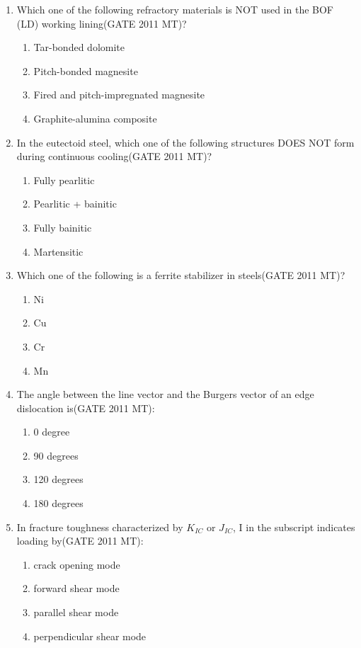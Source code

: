 \documentclass[12pt]{article}
\begin{document}
\begin{enumerate}
\item Which one of the following refractory materials is NOT used in the BOF (LD) working lining(GATE 2011 MT)?
    \begin{enumerate}
        \item Tar-bonded dolomite
        \item Pitch-bonded magnesite
        \item Fired and pitch-impregnated magnesite
        \item Graphite-alumina composite
    \end{enumerate}

\item In the eutectoid steel, which one of the following structures DOES NOT form during continuous cooling(GATE 2011 MT)?
    \begin{enumerate}
        \item Fully pearlitic
        \item Pearlitic + bainitic
        \item Fully bainitic
        \item Martensitic
    \end{enumerate}

\item Which one of the following is a ferrite stabilizer in steels(GATE 2011 MT)?
    \begin{enumerate}
        \item Ni
        \item Cu
        \item Cr
        \item Mn
    \end{enumerate}

\item The angle between the line vector and the Burgers vector of an edge dislocation is(GATE 2011 MT):
    \begin{enumerate}
        \item 0 degree
        \item 90 degrees
        \item 120 degrees
        \item 180 degrees
    \end{enumerate}

\item In fracture toughness characterized by $K_{IC}$ or $J_{IC}$, I in the subscript indicates loading by(GATE 2011 MT):
    \begin{enumerate}
        \item crack opening mode
        \item forward shear mode
        \item parallel shear mode
        \item perpendicular shear mode
    \end{enumerate}


\end{enumerate}
\end{document}

